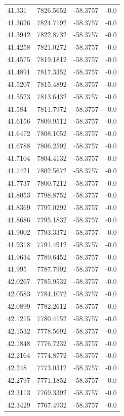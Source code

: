 \begin{table}[H]
\begin{tabular}{llll}
41.331 & 7826.5652 & -58.3757 & -0.0 \\
41.3626 & 7824.7192 & -58.3757 & -0.0 \\
41.3942 & 7822.8732 & -58.3757 & -0.0 \\
41.4258 & 7821.0272 & -58.3757 & -0.0 \\
41.4575 & 7819.1812 & -58.3757 & -0.0 \\
41.4891 & 7817.3352 & -58.3757 & -0.0 \\
41.5207 & 7815.4892 & -58.3757 & -0.0 \\
41.5523 & 7813.6432 & -58.3757 & -0.0 \\
41.584 & 7811.7972 & -58.3757 & -0.0 \\
41.6156 & 7809.9512 & -58.3757 & -0.0 \\
41.6472 & 7808.1052 & -58.3757 & -0.0 \\
41.6788 & 7806.2592 & -58.3757 & -0.0 \\
41.7104 & 7804.4132 & -58.3757 & -0.0 \\
41.7421 & 7802.5672 & -58.3757 & -0.0 \\
41.7737 & 7800.7212 & -58.3757 & -0.0 \\
41.8053 & 7798.8752 & -58.3757 & -0.0 \\
41.8369 & 7797.0292 & -58.3757 & -0.0 \\
41.8686 & 7795.1832 & -58.3757 & -0.0 \\
41.9002 & 7793.3372 & -58.3757 & -0.0 \\
41.9318 & 7791.4912 & -58.3757 & -0.0 \\
41.9634 & 7789.6452 & -58.3757 & -0.0 \\
41.995 & 7787.7992 & -58.3757 & -0.0 \\
42.0267 & 7785.9532 & -58.3757 & -0.0 \\
42.0583 & 7784.1072 & -58.3757 & -0.0 \\
42.0899 & 7782.2612 & -58.3757 & -0.0 \\
42.1215 & 7780.4152 & -58.3757 & -0.0 \\
42.1532 & 7778.5692 & -58.3757 & -0.0 \\
42.1848 & 7776.7232 & -58.3757 & -0.0 \\
42.2164 & 7774.8772 & -58.3757 & -0.0 \\
42.248 & 7773.0312 & -58.3757 & -0.0 \\
42.2797 & 7771.1852 & -58.3757 & -0.0 \\
42.3113 & 7769.3392 & -58.3757 & -0.0 \\
42.3429 & 7767.4932 & -58.3757 & -0.0 \\

\end{tabular}
\end{table}
